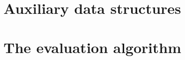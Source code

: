 \section{Auxiliary data structures}\label{sec:auxiliary_data_structure}



\section{The evaluation algorithm}\label{sec:evaluation}

%

